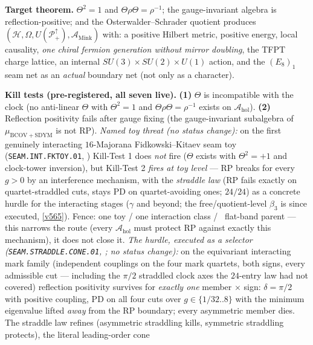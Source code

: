 \documentclass[11pt,a4paper]{article}
\begin{document}
\par\smallskip\noindent\textbf{Target theorem.} $\Theta^2=1$ and $\Theta\rho\Theta=\rho^{-1}$; the
gauge-invariant algebra is reflection-positive; and the Osterwalder--Schrader quotient produces
$(\mathcal H,\Omega,U(\mathcal P^\uparrow_+),\mathcal A_{\mathrm{Mink}})$ with: a positive Hilbert
metric, positive energy, local causality, \emph{one chiral fermion generation without mirror
doubling}, the TFPT charge lattice, an internal $SU(3){\times}SU(2){\times}U(1)$ action, and the
$(E_8)_1$ seam net as an \emph{actual} boundary net (not only as a character).

\par\smallskip\noindent\textbf{Kill tests (pre-registered, all seven live).}
\textbf{(1)} $\Theta$ is incompatible with the clock (no anti-linear $\Theta$ with $\Theta^2=1$ and
$\Theta\rho\Theta=\rho^{-1}$ exists on $\mathcal A_{\mathrm{hol}}$).
\textbf{(2)} Reflection positivity fails after gauge fixing (the gauge-invariant subalgebra of
$\mu_{\mathrm{BCOV+SDYM}}$ is not RP).
\emph{Named toy threat (no status change):} on the first genuinely interacting $16$-Majorana
Fidkowski--Kitaev seam toy (\texttt{SEAM.INT.FKTOY.01}, )
Kill-Test 1 does \emph{not} fire ($\Theta$ exists with $\Theta^2=+1$ and clock-tower inversion),
but Kill-Test 2 \emph{fires at toy level} --- RP breaks for every $g>0$ by an interference
mechanism, with the \emph{straddle law} (RP fails exactly on quartet-straddled cuts, stays PD on
quartet-avoiding ones; $24/24$) as a concrete hurdle for the interacting stages ($\gamma$ and
beyond; the free/quotient-level $\beta_3$ is since executed, \vref{v565}). Fence: one toy / one
interaction class / \mC\ flat-band parent --- this narrows the route (every $\mathcal A_{\mathrm{hol}}$
must protect RP against exactly this mechanism), it does not close it.
\emph{The hurdle, executed as a selector (\texttt{SEAM.STRADDLE.CONE.01},
; no status change):} on the equivariant interacting mark
family (independent couplings on the four mark quartets, both signs, every admissible cut ---
including the $\pi/2$ straddled clock axes the $24$-entry law had not covered) reflection
positivity survives for \emph{exactly one} member $\times$ sign: $\delta=\pi/2$ with positive
coupling, PD on all four cuts over $g\in\{1/32..8\}$ with the minimum eigenvalue lifted
\emph{away} from the RP boundary; every asymmetric member dies. The straddle law refines
(asymmetric straddling kills, symmetric straddling protects), the literal leading-order cone
\end{document}
